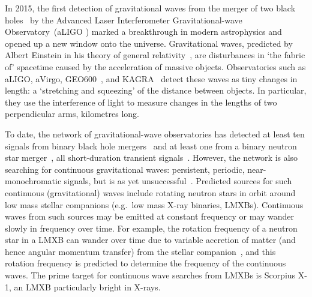 \documentclass[paper-main.tex]{subfiles}
\begin{document}
In 2015, the first detection of gravitational waves from the merger of two black holes~\cite{GW150914} by the Advanced Laser Interferometer Gravitational-wave Observatory~(aLIGO \citep{AdvancedLIGO:2015}) marked a breakthrough in modern astrophysics and opened up a new window onto the universe. 
Gravitational waves, predicted by Albert Einstein in his theory of general relativity~\cite{Einstein:1916}, are disturbances in `the fabric of' spacetime caused by the acceleration of massive objects.
Observatories such as aLIGO, aVirgo, GEO600~\cite{GEO600:2010}, and KAGRA~\cite{KAGRA:2013} detect these waves as tiny changes in length: a `stretching and squeezing' of the distance between objects.
In particular, they use the interference of light to measure changes in the lengths of two perpendicular arms, kilometres long.


To date, the network of gravitational-wave observatories has detected at least ten signals from binary black hole mergers~\cite{GW151226,GW170104,GW170814,GWTC-1:2018} and at least one from a binary neutron star merger~\cite{GW170817,GW170817multi,GW190425, GWTC-1:2018}, all short-duration transient signals~\cite{GWTC-1:2018,GWOSC:online}. 
However, the network is also searching for continuous gravitational waves: persistent, periodic, near-monochromatic signals, but is as yet unsuccessful~\cite{ScoX1O2Viterbi:2019,RadiometerO1O2:2019,SearchCrossCorrO1:2017,ScoX1ViterbiO1:2017,SearchRadiometerO1:2017,SearchCrossCorrO1:2017,MiddletonEtAlO2LMXBs:2020,SearchTwoSpecS6:2017}.
Predicted sources for such continuous (gravitational) waves include rotating neutron stars in orbit around low mass stellar companions (e.g.\ low mass X-ray binaries, LMXBs). Continuous waves from such sources may be emitted at constant frequency or may wander slowly in frequency over time. 
For example, the rotation frequency of a neutron star in a LMXB can wander over time due to variable accretion of matter (and hence angular momentum transfer) from the stellar companion~\cite{xraybinaries:1997}, and this rotation frequency is predicted to determine the frequency of the continuous waves.
The prime target for continuous wave searches from LMXBs is Scorpius X-1, an LMXB particularly bright in X-rays.
\end{document}
